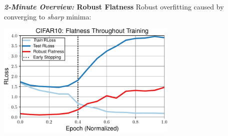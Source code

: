 \documentclass[64pt,aspectratio=169]{beamer}
\begin{document}
	\begin{frame}[t]{\bfseries \textit{2-Minute Overview:} Robust Flatness}
		\Large
		Robust overfitting caused by converging to \emph{sharp} minima:
		\vspace*{-2px}
		\begin{center}
			\includegraphics[height=5.5cm]{plots/talk_overview2.pdf}
		\end{center}
	\end{frame}
	
\end{document}
